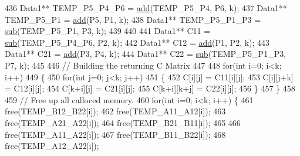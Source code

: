 \begin{DoxyCode}
436                                 Data1** TEMP\_P5\_P4\_P6 = \hyperlink{classMATOPS_1_1BigMatrix_a175eecea05e419357d7475f5e3e938da}{add}(TEMP\_P5\_P4, P6, k);
437                                 Data1** TEMP\_P5\_P1 = \hyperlink{classMATOPS_1_1BigMatrix_a175eecea05e419357d7475f5e3e938da}{add}(P5, P1, k);
438                                 Data1** TEMP\_P5\_P1\_P3 = \hyperlink{classMATOPS_1_1BigMatrix_a5c89e7f360fb3cc32abbf6f1d430fb1f}{sub}(TEMP\_P5\_P1, P3, k);
439 
440 
441                                 Data1** C11 = \hyperlink{classMATOPS_1_1BigMatrix_a5c89e7f360fb3cc32abbf6f1d430fb1f}{sub}(TEMP\_P5\_P4\_P6, P2, k);
442                                 Data1** C12 = \hyperlink{classMATOPS_1_1BigMatrix_a175eecea05e419357d7475f5e3e938da}{add}(P1, P2, k);
443                                 Data1** C21 = \hyperlink{classMATOPS_1_1BigMatrix_a175eecea05e419357d7475f5e3e938da}{add}(P3, P4, k);
444                                 Data1** C22 = \hyperlink{classMATOPS_1_1BigMatrix_a5c89e7f360fb3cc32abbf6f1d430fb1f}{sub}(TEMP\_P5\_P1\_P3, P7, k);
445 
446                                 \textcolor{comment}{// Building the returning C Matrix}
447 
448                                 \textcolor{keywordflow}{for}(\textcolor{keywordtype}{int} i=0; i<k; i++)
449                                 \{
450                                         \textcolor{keywordflow}{for}(\textcolor{keywordtype}{int} j=0; j<k; j++)
451                                         \{
452                                                 C[i][j] = C11[i][j];
453                                                 C[i][j+k] = C12[i][j];
454                                                 C[k+i][j] = C21[i][j];
455                                                 C[k+i][k+j] = C22[i][j];
456                                         \}
457                                 \}
458 
459                                 \textcolor{comment}{// Free up all calloced memory.}
460                                 \textcolor{keywordflow}{for}(\textcolor{keywordtype}{int} i=0; i<k; i++) \{
461                                                 free(TEMP\_B12\_B22[i]);
462                                                 free(TEMP\_A11\_A12[i]);
463                                                 free(TEMP\_A21\_A22[i]);
464                                                 free(TEMP\_B21\_B11[i]);
465 
466                                                 free(TEMP\_A11\_A22[i]);
467                                                 free(TEMP\_B11\_B22[i]);
468                                                 free(TEMP\_A12\_A22[i]);

\end{DoxyCode}
